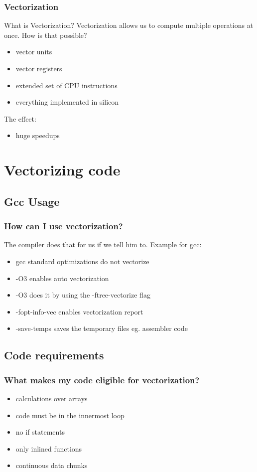 \documentclass[compress]{beamer}
\begin{document}
\begin{frame}[fragile]
    \frametitle{Vectorization}
What is Vectorization?\newline\newline
Vectorization allows us to compute multiple operations at once.\newline\newline
How is that possible?
    \begin{itemize}
        \item vector units
        \item vector registers 
        \item extended set of CPU instructions
        \item everything implemented in silicon
    \end{itemize}
The effect:
    \begin{itemize}
        \item huge speedups
    \end{itemize}
\end{frame}
\section{Vectorizing code}
\subsection{Gcc Usage}
\begin{frame}
    \frametitle{How can I use vectorization?}
    The compiler does that for us if we tell him to.\newline
    Example for gcc:
    \begin{itemize}
        \item gcc standard optimizations do not vectorize 
        \item -O3 enables auto vectorization
        \item -O3 does it by using the -ftree-vectorize flag 
        \item -fopt-info-vec enables vectorization report
        \item -save-temps saves the temporary files eg. assembler code
    \end{itemize}
\end{frame}
\subsection{Code requirements}
\begin{frame}[fragile]
    \frametitle{What makes my code eligible for vectorization?}
    \begin{itemize}
        \item calculations over arrays
        \item code must be in the innermost loop 
        \item no if statements
        \item only inlined functions 
        \item continuous data chunks
    \end{itemize}
\end{frame}
\end{document}
